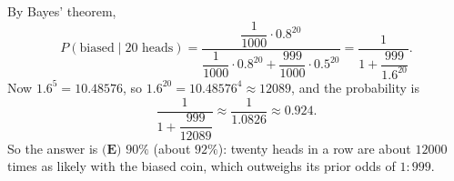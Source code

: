 By Bayes' theorem,
\[P(\text{biased}\mid20\text{ heads})=\dfrac{\dfrac1{1000}\cdot0.8^{20}}{\dfrac1{1000}\cdot0.8^{20}+\dfrac{999}{1000}\cdot0.5^{20}}=\dfrac{1}{1+\dfrac{999}{1.6^{20}}}.\]
Now $1.6^5=10.48576$, so $1.6^{20}=10.48576^4\approx12089$, and the probability is
\[\dfrac{1}{1+\dfrac{999}{12089}}\approx\dfrac{1}{1.0826}\approx0.924.\]
So the answer is $\boxed{\textbf{(E) }90\%}$ (about $92\%$): twenty heads in a row are about $12000$ times as likely with the biased coin, which outweighs its prior odds of $1:999$.
